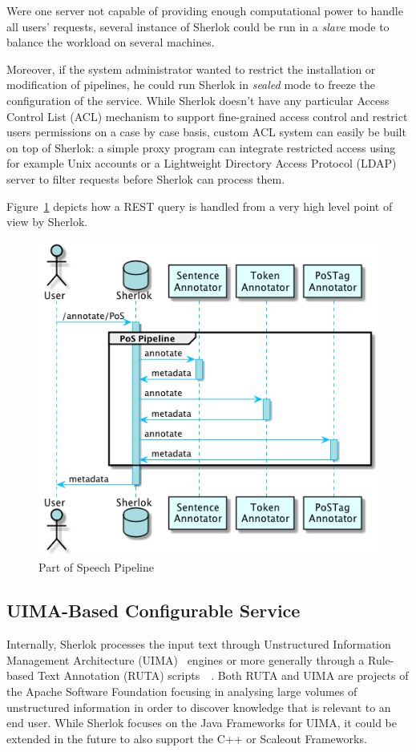 \documentclass{article}
\begin{document}
Were one server not capable of providing enough computational power to handle all users' requests,
several instance of Sherlok could be run in a \emph{slave} mode to balance the workload on several
machines.

Moreover, if the system administrator wanted to restrict the installation or modification of
pipelines, he could run Sherlok in \emph{sealed} mode to freeze the configuration of the service.
While Sherlok doesn't have any particular Access Control List (ACL) mechanism to support
fine-grained access control and restrict users permissions on a case by case basis, custom ACL
system can easily be built on top of Sherlok: a simple proxy program can integrate restricted access
using for example Unix accounts or a Lightweight Directory Access Protocol (LDAP) server to filter
requests before Sherlok can process them.

Figure~\ref{fig:sherlok_basic_rest_call} depicts how a REST query is handled from a very high level
point of view by Sherlok.

\begin{figure}
    \centering
    \includegraphics[width=0.7\linewidth]{res/sherlok_basic_rest_call.png}
    \caption{Part of Speech Pipeline}
    \label{fig:sherlok_basic_rest_call}
\end{figure}

\subsection{UIMA-Based Configurable Service}

Internally, Sherlok processes the input text through Unstructured Information Management
Architecture (UIMA)~\cite{uima} engines or more generally through a Rule-based Text Annotation
(RUTA) scripts~\cite{ruta}~\cite{ruta_2014}. Both RUTA and UIMA are projects of the Apache Software
Foundation \cite{apachefundation} focusing in analysing large volumes of unstructured information in
order to discover knowledge that is relevant to an end user. While Sherlok focuses on the Java
Frameworks for UIMA, it could be extended in the future to also support the C++ or Scaleout
Frameworks.
\end{document}
